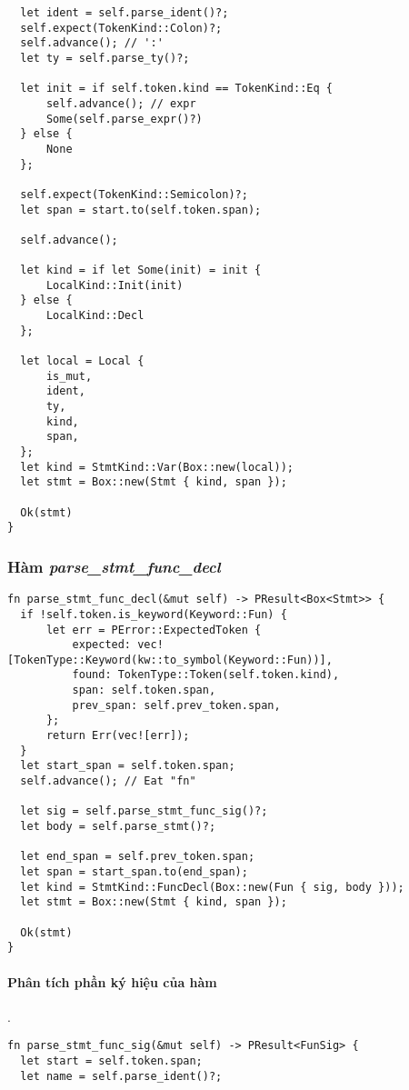 {\begin{lstlisting}
  let ident = self.parse_ident()?;
  self.expect(TokenKind::Colon)?;
  self.advance(); // ':'
  let ty = self.parse_ty()?;

  let init = if self.token.kind == TokenKind::Eq {
      self.advance(); // expr
      Some(self.parse_expr()?)
  } else {
      None
  };

  self.expect(TokenKind::Semicolon)?;
  let span = start.to(self.token.span);

  self.advance();

  let kind = if let Some(init) = init {
      LocalKind::Init(init)
  } else {
      LocalKind::Decl
  };

  let local = Local {
      is_mut,
      ident,
      ty,
      kind,
      span,
  };
  let kind = StmtKind::Var(Box::new(local));
  let stmt = Box::new(Stmt { kind, span });

  Ok(stmt)
}
\end{lstlisting}

\subsubsection{Hàm \textit{parse\_stmt\_func\_decl}}
\label{ap1:stmt_decl_fun}
\begin{lstlisting}
fn parse_stmt_func_decl(&mut self) -> PResult<Box<Stmt>> {
  if !self.token.is_keyword(Keyword::Fun) {
      let err = PError::ExpectedToken {
          expected: vec![TokenType::Keyword(kw::to_symbol(Keyword::Fun))],
          found: TokenType::Token(self.token.kind),
          span: self.token.span,
          prev_span: self.prev_token.span,
      };
      return Err(vec![err]);
  }
  let start_span = self.token.span;
  self.advance(); // Eat "fn"

  let sig = self.parse_stmt_func_sig()?;
  let body = self.parse_stmt()?;

  let end_span = self.prev_token.span;
  let span = start_span.to(end_span);
  let kind = StmtKind::FuncDecl(Box::new(Fun { sig, body }));
  let stmt = Box::new(Stmt { kind, span });

  Ok(stmt)
}
\end{lstlisting}

\paragraph{Phân tích phần ký hiệu của hàm}.
\label{ap1:stmt_decl_fun_sig}
\begin{lstlisting}
fn parse_stmt_func_sig(&mut self) -> PResult<FunSig> {
  let start = self.token.span;
  let name = self.parse_ident()?;


\end{lstlisting}}
